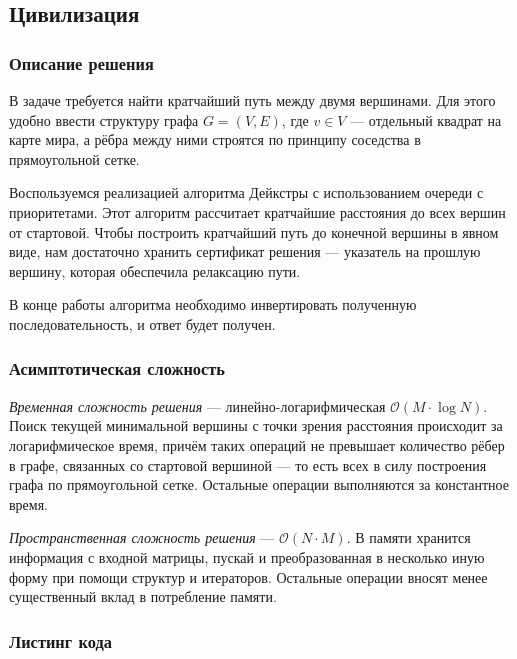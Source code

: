 \subsection{Цивилизация}

\subsubsection{Описание решения}

В задаче требуется найти кратчайший путь между двумя вершинами. Для этого удобно ввести структуру графа \( G=(V,E) \), где \( v\in V \) --- отдельный квадрат на карте мира, а рёбра между ними строятся по принципу соседства в прямоугольной сетке.

Воспользуемся реализацией алгоритма Дейкстры с использованием очереди с приоритетами. Этот алгоритм рассчитает кратчайшие расстояния до всех вершин от стартовой. Чтобы построить кратчайший путь до конечной вершины в явном виде, нам достаточно хранить сертификат решения --- указатель на прошлую вершину, которая обеспечила релаксацию пути.

В конце работы алгоритма необходимо инвертировать полученную последовательность, и ответ будет получен.

\subsubsection{Асимптотическая сложность}

\textit{Временная сложность решения} --- линейно-логарифмическая \( \mathcal{O}(M\cdot\log N) \). Поиск текущей минимальной вершины с точки зрения расстояния происходит за логарифмическое время, причём таких операций не превышает количество рёбер в графе, связанных со стартовой вершиной --- то есть всех в силу построения графа по прямоугольной сетке. Остальные операции выполняются за константное время.

\textit{Пространственная сложность решения} --- \( \mathcal{O}(N\cdot M) \). В памяти хранится информация с входной матрицы, пускай и преобразованная в несколько иную форму при помощи структур и итераторов. Остальные операции вносят менее существенный вклад в потребление памяти.

\subsubsection{Листинг кода}

